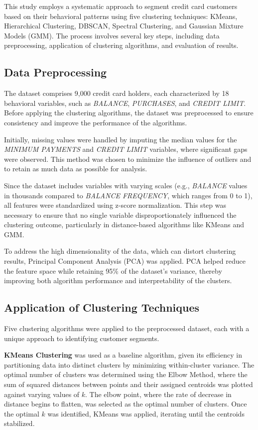 \documentclass[runningheads,a4paper]{llncs}
\begin{document}
This study employs a systematic approach to segment credit card customers based on their behavioral patterns using five clustering techniques: KMeans, Hierarchical Clustering, DBSCAN, Spectral Clustering, and Gaussian Mixture Models (GMM). The process involves several key steps, including data preprocessing, application of clustering algorithms, and evaluation of results.

\subsection{Data Preprocessing}

The dataset comprises 9,000 credit card holders, each characterized by 18 behavioral variables, such as \textit{BALANCE}, \textit{PURCHASES}, and \textit{CREDIT LIMIT}. Before applying the clustering algorithms, the dataset was preprocessed to ensure consistency and improve the performance of the algorithms.

Initially, missing values were handled by imputing the median values for the \textit{MINIMUM PAYMENTS} and \textit{CREDIT LIMIT} variables, where significant gaps were observed. This method was chosen to minimize the influence of outliers and to retain as much data as possible for analysis.

Since the dataset includes variables with varying scales (e.g., \textit{BALANCE} values in thousands compared to \textit{BALANCE FREQUENCY}, which ranges from 0 to 1), all features were standardized using z-score normalization. This step was necessary to ensure that no single variable disproportionately influenced the clustering outcome, particularly in distance-based algorithms like KMeans and GMM.

To address the high dimensionality of the data, which can distort clustering results, Principal Component Analysis (PCA) was applied. PCA helped reduce the feature space while retaining 95\% of the dataset's variance, thereby improving both algorithm performance and interpretability of the clusters.

\subsection{Application of Clustering Techniques}

Five clustering algorithms were applied to the preprocessed dataset, each with a unique approach to identifying customer segments.

\textbf{KMeans Clustering} was used as a baseline algorithm, given its efficiency in partitioning data into distinct clusters by minimizing within-cluster variance. The optimal number of clusters was determined using the Elbow Method, where the sum of squared distances between points and their assigned centroids was plotted against varying values of $k$. The elbow point, where the rate of decrease in distance begins to flatten, was selected as the optimal number of clusters. Once the optimal $k$ was identified, KMeans was applied, iterating until the centroids stabilized.
\end{document}
